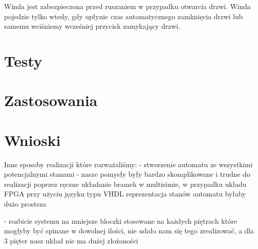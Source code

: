 \documentclass[a4paper]{article}
\begin{document}
Winda jest zabezpieczona przed ruszaniem w przypadku otwarcia drzwi. Winda pojedzie tylko wtedy, gdy upłynie
czas automatycznego zamknięcia drzwi lub samemu wciśniemy wcześniej przycisk zamykający drzwi.

\section{Testy}
\section{Zastosowania}
\section{Wnioski}
Inne sposoby realizacji które rozważaliśmy:
 - stworzenie automatu ze wszystkimi potencjalnymi stanami - nasze pomysły były bardzo skomplikowane
    i trudne do realizacji poprzez ręczne układanie bramek w multisimie, w przypadku układu FPGA
    przy użyciu języku typu VHDL reprezentacja stanów automatu byłaby dużo prostsza

- rozbicie systemu na mniejsze bloczki stosowane na każdych piętrach które mogłyby być 
    spinane w dowolnej ilości, nie udało nam się tego zrealizować, a dla 3 pięter nasz układ
    nie ma dużej złożoności
\end{document}
